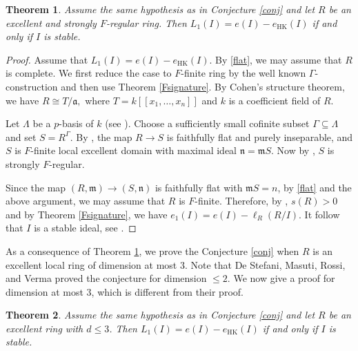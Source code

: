 \documentclass[11pt, reqno]{amsart}
\theoremstyle{plain}
\newtheorem{theorem}{Theorem}[section]
\newcommand{\m}{\mathfrak{m}}
\newcommand{\n}{\mathfrak{n}}
\theoremstyle{plain}
\begin{document}
\begin{theorem}\label{conjecture-dimd}
Assume the same hypothesis as in Conjecture \ref{conj} and let $R$ be an excellent and strongly $F$-regular ring. Then
$L_1(I)=e(I)-e_{\mathrm{HK}}(I)$ if and only if $I$ is stable.
\end{theorem}
\begin{proof}
Assume that $L_1(I)=e(I)-e_{\mathrm{HK}}(I)$. By \ref{flat}, we may assume that $R$ is complete. We first reduce the case to $F$-finite ring by the well known $\Gamma$-construction and then use Theorem \ref{Fsignature}. By Cohen's structure theorem, we have $R\cong T/\mathfrak a,$ where $T=k[[x_1,\ldots,x_n]]$ and $k$ is a coefficient field of $R.$ 

Let $\Lambda$ be a $p$-basis of $k$ (see \cite[3.1]{strong}). Choose a sufficiently small cofinite subset $\Gamma\subseteq\Lambda$ and set $S=R^\Gamma.$ By \cite[6.11, 6.13, 6.6(d)]{HH94}, the map $R\to S$ is faithfully flat and purely inseparable, and $S$ is $F$-finite local excellent domain with maximal ideal $\n=\m S$. Now by \cite[Theorem 3.4(ii)]{strong}, $S$ is strongly $F$-regular. 

Since the map $(R,\m)\to (S,\n)$ is faithfully flat with $\m S=n$, by \ref{flat} and the above argument, we may assume that $R$ is $F$-finite. Therefore, by \cite[Theorem 0.2]{AL03},  $s(R)>0$ and by Theorem \ref{Fsignature}, we have $e_1(I)=e(I)-\ell_R(R/I).$ It follow that $I$ is a stable ideal, see \cite[Theorem 16]{HCCMM}.
\end{proof}


As a consequence of Theorem \ref{conjecture-dimd}, we prove the Conjecture \ref{conj} when $R$ is an excellent local ring of dimension at most $3$. Note that De Stefani, Masuti, Rossi, and Verma \cite{shreedevi} proved the conjecture for dimension $\leq2$. We now give a proof for dimension at most $3$, which is different from their proof.

\begin{theorem}\label{conjecture-dim3}
Assume the same hypothesis as in Conjecture \ref{conj} and let $R$ be an excellent ring with $d\leq 3$. Then
$L_1(I)=e(I)-e_{\mathrm{HK}}(I)$ if and only if $I$ is stable.
\end{theorem}
\end{document}
